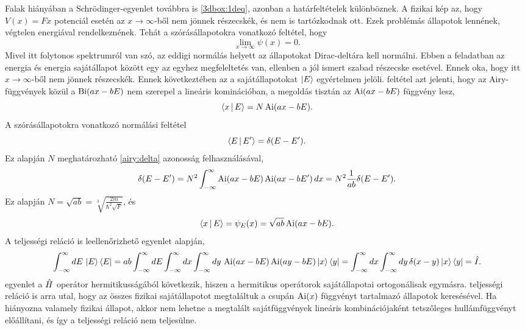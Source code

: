 \label{nowall}
Falak hiányában a Schrödinger-egyenlet továbbra is \eqref{3dbox:1deq}, azonban a határfeltételek különböznek. A fizikai kép az, hogy $V(x)=Fx$ potenciál esetén az $x\to\infty$-ből nem jönnek részecskék, és nem is tartózkodnak ott. Ezek problémás állapotok lennének, végtelen energiával rendelkeznének. Tehát a szórásállapotokra vonatkozó feltétel, hogy
\begin{equation}
	\lim_{x\to\infty}\psi(x) = 0.
	\label{nowall:boundary}
\end{equation}
Mivel itt folytonos spektrumról van szó, az eddigi normálás helyett az állapotokat Dirac-deltára kell normálni. Ebben a feladatban az energia és energia sajátállapot között egy az egyhez megfeleltetés van, ellenben a jól ismert szabad részecske esetével. Ennek oka, hogy itt $x\to\infty$-ből nem jönnek részecskék. Ennek következtében az a sajátállapotokat $\Ket{E}$ egyértelmen jelöli.
 feltétel azt jelenti, hogy az Airy-függvények közül a $\operatorname{Bi}(ax-bE)$ nem szerepel a lineáris kominációban, a megoldás tisztán az $\operatorname{Ai}(ax-bE)$ függvény lesz,
\begin{equation}
	\Braket{x|E}=N\operatorname{Ai}(ax-bE).
\end{equation}
A szórásállapotokra vonatkozó normálási feltétel
\begin{equation}
	\Braket{E|E^\prime}=\delta(E-E^\prime).
\end{equation}
Ez alapján $N$ meghatározható \eqref{airy:delta} azonosság felhasználásával,
\begin{dmath}
	\delta(E-E^\prime)=N^2\int_{-\infty}^\infty\Ai(ax-bE)\Ai(ax-bE^\prime)\,dx=N^2\frac{1}{ab}\delta(E-E^\prime).
	\label{nowall:orthog}
\end{dmath}
Ez alapján $N=\sqrt{ab}=\sqrt[3]{\frac{2m}{\hbar^2\sqrt{F}}}$, és
\begin{equation}
	\Braket{x|E}=\psi_E(x)=\sqrt{ab}\operatorname{Ai}(ax-bE).
\end{equation}
A teljességi reláció is leellenőrizhető  egyenlet alapján,
\begin{dmath}
	\int_{-\infty}^\infty dE\,\Ket{E}\Bra{E}=ab\int_{-\infty}^\infty dE\int_{-\infty}^\infty dx\int_{-\infty}^\infty dy\,\Ai(ax-bE)\Ai(ay-bE)\Ket{x}\Bra{y}=\int_{-\infty}^\infty dx\int_{-\infty}^\infty dy\,\delta(x-y)\Ket{x}\Bra{y}=\op{I}.
	\label{nowall:comleteness}
\end{dmath}
 egyenlet a $\hat{H}$ operátor hermitikusságából következik, hiszen a hermitikus operátorok sajátállapotai ortogonálisak egymásra.  teljességi reláció is arra utal, hogy az összes fizikai sajátállapotot megtaláltuk a csupán $\operatorname{Ai}(x)$ függvényt tartalmazó állapotok keresésével. Ha hiányozna valamely fizikai állapot, akkor nem lehetne a megtalált sajátfüggvények lineáris kombinációjaként tetszőleges hullámfüggvényt előállítani, és így a teljességi reláció nem teljesülne.

